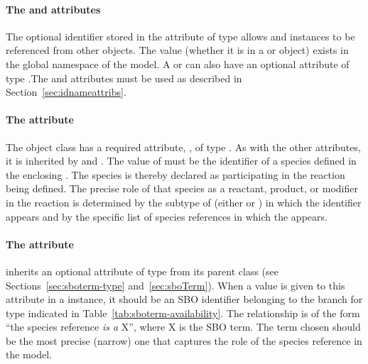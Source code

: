 \paragraph{The  and  attributes}

The optional identifier stored in the  attribute  of type
 allows \SpeciesReference and \ModifierSpeciesReference 
instances to be referenced from other objects. The  value 
(whether it is in a \SpeciesReference or \ModifierSpeciesReference object) 
exists in the global namespace of the model.   A
\SpeciesReference or \ModifierSpeciesReference can also have an 
optional  attribute of type
.The  and 
attributes must be used as described in
Section~\ref{sec:idnameattribs}.


\paragraph{The  attribute}

The \SimpleSpeciesReference object class has a required attribute,
, of type .  As with the other
attributes, it is inherited by \SpeciesReference and
\ModifierSpeciesReference.  The value of  must be the
identifier of a species defined in the enclosing \Model.  The
species is thereby declared as participating in the reaction being
defined.  The precise role of that species as a reactant, product,
or modifier in the reaction is determined by the subtype of
\SimpleSpeciesReference (\ie either \SpeciesReference or
\ModifierSpeciesReference) in which the identifier appears and by the 
specific list of species references in which the \SpeciesReference appears.


\paragraph{The  attribute}
\label{sec:simplespeciesreference-sboterm}

\SimpleSpeciesReference inherits an optional 
attribute of type  from its parent
class \SBase (see Sections~\ref{sec:sboterm-type}
and~\ref{sec:sboTerm}).  When a value is given to this
attribute in a  \SimpleSpeciesReference instance, it should be an
SBO identifier belonging to the branch for type  \SimpleSpeciesReference 
indicated in Table~\ref{tab:sboterm-availability}.  The relationship is
of the form ``the species reference \emph{is a} X'', where X is
the SBO term.  The term chosen should be the most precise (narrow)
one that captures the role of the species reference in the model.

